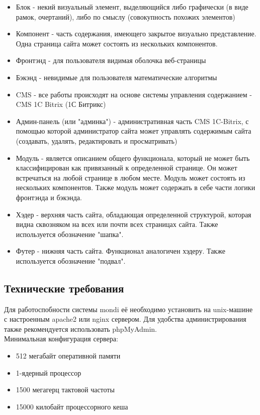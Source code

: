\documentclass[DIV=calc, paper=a4, fontsize=11pt]{scrartcl} %
\begin{document}
        \begin{itemize}
        \item Блок - некий визуальный элемент, выделяющийся либо графически (в виде рамок, очертаний), либо по смыслу (совокупность похожих элементов)
        \item Компонент - часть содержания, имеющего закрытое визуально представление. Одна страница сайта может состоять из нескольких компонентов.
        \item Фронтэнд - для пользователя видимая оболочка веб-страницы
        \item Бэкэнд - невидимые для пользователя математические алгоритмы
        \item CMS - все работы происходят на основе системы управления содержанием - CMS 1C Bitrix (1С Битрикс)
        \item Админ-панель (или "админка") - административная часть CMS 1C-Bitrix, с помощью которой администратор сайта может управлять содержимым сайта (создавать, удалять, редактировать и просматривать)
        \item Модуль - является описанием общего функционала, который не может быть классифицирован как привязанный к определенной странице. Он может встречаться на любой странице в любом месте. Модуль может состоять из нескольких компонентов. Также модуль может содержать в себе части логики фронтэнда и бэкэнда.
        \item Хэдер - верхняя часть сайта, обладающая определенной структурой, которая видна сквозняком на всех или почти всех страницах сайта. Также используется обозначение "шапка".
        \item Футер - нижняя часть сайта. Функционал аналогичен хэдеру. Также используется обозначение "подвал".
    \end{itemize}
    
\subsection{Технические требования}
Для работоспобности системы mondi её необходимо установить на unix-машине с настроенным apache2 или nginx сервером.
Для удобства администрирования также рекомендуется использовать phpMyAdmin.
\\[0.5cm]
Минимальная конфигурация сервера:
\begin{itemize}
	\item 512 мегабайт оперативной памяти
	\item 1-ядерный процессор
	\item 1500 мегагерц тактовой частоты
	\item 15000 килобайт процессорного кеша
\end{itemize}
\end{document}
